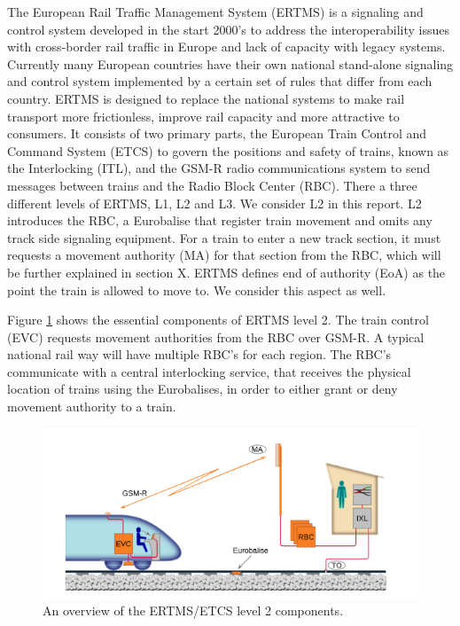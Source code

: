 \documentclass[preprint,12pt]{elsarticle}
\begin{document}
The European Rail Traffic Management System (ERTMS) is a signaling and control system developed in the start 2000's to address the interoperability issues with cross-border rail traffic in Europe and lack of capacity with legacy systems. Currently many European countries have their own national stand-alone signaling and control system implemented by a certain set of rules that differ from each country. ERTMS is designed to replace the national systems to make rail transport more frictionless, improve rail capacity and more attractive to consumers. It consists of two primary parts, the European Train Control and Command System (ETCS) to govern the positions and safety of trains, known as the Interlocking (ITL), and the GSM-R radio communications system to send messages between trains and the Radio Block Center (RBC). There a three different levels of ERTMS, L1, L2 and L3. We consider L2 in this report. L2 introduces the RBC, a Eurobalise that register train movement and omits any track side signaling equipment. For a train to enter a new track section, it must requests a movement authority (MA) for that section from the RBC, which will be further explained in section X. ERTMS defines end of authority (EoA) as the point the train is allowed to move to. We consider this aspect as well.

Figure \ref{fig:ertmsoverview} shows the essential components of ERTMS level 2. The train control (EVC) requests movement authorities from the RBC over GSM-R. A typical national rail way will have multiple RBC's for each region. The RBC's communicate with a central interlocking service, that receives the physical location of trains using the Eurobalises, in order to either grant or deny movement authority to a train.

\begin{figure}[h]
	\centering
	\includegraphics[width=0.8\linewidth]{ERTMS.png}
	\caption{An overview of the ERTMS/ETCS level 2 components.}
	\label{fig:ertmsoverview}
\end{figure}
\end{document}
